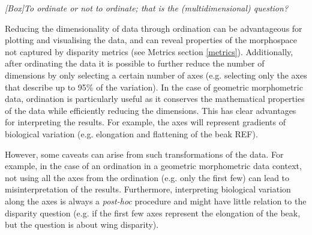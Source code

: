 \documentclass[12pt,letterpaper]{article}
\renewcommand{\subsection}[1]{%
\bigskip
\begin{center}
\begin{large}
\normalfont\itshape #1
\end{large}
\end{center}}
\begin{document}
\subsection{[Box]To ordinate or not to ordinate; that is the (multidimensional) question?}
\label{box_ordination}


Reducing the dimensionality of data through ordination can be advantageous for plotting and visualising the data, and can reveal properties of the morphospace not captured by disparity metrics (see Metrics section \ref{metrics}).
Additionally, after ordinating the data it is possible to further reduce the number of dimensions by only selecting a certain number of axes (e.g. selecting only the axes that describe up to 95\% of the variation).
In the case of geometric morphometric data, ordination is particularly useful as it conserves the mathematical properties of the data while efficiently reducing the dimensions.
This has clear advantages for interpreting the results.
For example, the axes will represent gradients of biological variation (e.g. elongation and flattening of the beak REF).

However, some caveats can arise from such transformations of the data.
For example, in the case of an ordination in a geometric morphometric data context, not using all the axes from the ordination (e.g. only the first few) can lead to misinterpretation of the results.
Furthermore, interpreting biological variation along the axes is always a \textit{post-hoc} procedure and might have little relation to the disparity question (e.g. if the first few axes represent the elongation of the beak, but the question is about wing disparity).
\end{document}

